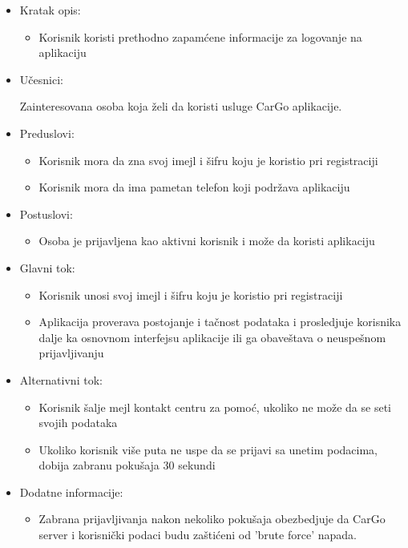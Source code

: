 \begin{itemize}
    \item Kratak opis:
        \begin{itemize}
            \item Korisnik koristi prethodno zapamćene informacije za logovanje na aplikaciju
        \end{itemize}
    \item Učesnici:
        \begin{itemize}
            Zainteresovana osoba koja želi da koristi usluge CarGo aplikacije.
        \end{itemize}
    \item Preduslovi:
        \begin{itemize}
            \item Korisnik mora da zna svoj imejl i šifru koju je koristio pri registraciji
            \item Korisnik mora da ima pametan telefon koji podržava aplikaciju
        \end{itemize}
    \item Postuslovi:
        \begin{itemize}
            \item Osoba je prijavljena kao aktivni korisnik i može da koristi aplikaciju
        \end{itemize}
    \item Glavni tok:
        \begin{itemize}
            \item Korisnik unosi svoj imejl i šifru koju je koristio pri registraciji
            \item Aplikacija proverava postojanje i tačnost podataka i prosledjuje korisnika dalje ka osnovnom interfejsu aplikacije ili ga obaveštava o neuspešnom prijavljivanju
        \end{itemize}
    \item Alternativni tok:
        \begin{itemize}
            \item Korisnik šalje mejl kontakt centru za pomoć, ukoliko ne može da se seti svojih podataka
            \item Ukoliko korisnik više puta ne uspe da se prijavi sa unetim podacima, dobija zabranu pokušaja 30 sekundi
        \end{itemize}
    \item Dodatne informacije:
        \begin{itemize}
            \item Zabrana prijavljivanja nakon nekoliko pokušaja obezbedjuje da CarGo server i korisnički podaci budu zaštićeni od 'brute force' napada.
        \end{itemize}
\end{itemize}


